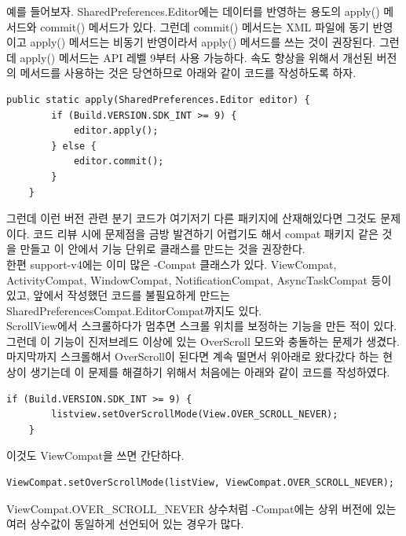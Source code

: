 예를 들어보자. SharedPreferences.Editor에는 데이터를 반영하는 용도의 apply() 메서드와 commit() 메서드가 있다. 
그런데 commit() 메서드는 XML 파일에 동기 반영이고 apply() 메서드는 비동기 반영이라서 apply() 메서드를 쓰는 것이 권장된다. 
그런데 apply() 메서드는 API 레벨 9부터 사용 가능하다. 속도 향상을 위해서 개선된 버전의 메서드를 사용하는 것은 당연하므로 아래와 같이 코드를 작성하도록 하자.
\begin{lstlisting}[frame=single]
	public static apply(SharedPreferences.Editor editor) {
		if (Build.VERSION.SDK_INT >= 9) {
   			editor.apply();
   		} else {
   			editor.commit();
   		}
	}
\end{lstlisting}

그런데 이런 버전 관련 분기 코드가 여기저기 다른 패키지에 산재해있다면 그것도 문제이다. 코드 리뷰 시에 문제점을 금방 발견하기 어렵기도 해서 compat 패키지 같은 것을 만들고 이 안에서 기능 단위로 클래스를 만드는 것을 권장한다.\\

한편 support-v4에는 이미 많은 -Compat 클래스가 있다. ViewCompat, ActivityCompat, WindowCompat, NotificationCompat, AsyncTaskCompat 등이 있고, 앞에서 작성했던 코드를 불필요하게 만드는 SharedPreferencesCompat.EditorCompat까지도 있다.\\

ScrollView에서 스크롤하다가 멈추면 스크롤 위치를 보정하는 기능을 만든 적이 있다. 그런데 이 기능이 진저브레드 이상에 있는 OverScroll 모드와 충돌하는 문제가 생겼다.
마지막까지 스크롤해서 OverScroll이 된다면 계속 떨면서 위아래로 왔다갔다 하는 현상이 생기는데 이 문제를 해결하기 위해서 처음에는 아래와 같이 코드를 작성하였다.
\begin{lstlisting}[frame=single]
	if (Build.VERSION.SDK_INT >= 9) {
   		listview.setOverScrollMode(View.OVER_SCROLL_NEVER);
	}
\end{lstlisting}
이것도 ViewCompat을 쓰면 간단하다.
\begin{lstlisting}[frame=single]
	ViewCompat.setOverScrollMode(listView, ViewCompat.OVER_SCROLL_NEVER);
\end{lstlisting}
ViewCompat.OVER\_SCROLL\_NEVER 상수처럼 -Compat에는 상위 버전에 있는 여러 상수값이 동일하게 선언되어 있는 경우가 많다.\\

